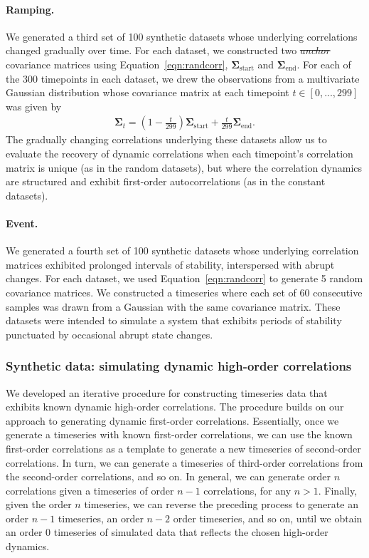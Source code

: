 \documentclass[english]{article}
\providecommand{\DIFaddtex}[1]{{\protect\color{blue}\uwave{#1}}} %
\providecommand{\DIFdeltex}[1]{{\protect\color{red}\sout{#1}}}                      %
\providecommand{\DIFaddbegin}{} %
\providecommand{\DIFaddend}{} %
\providecommand{\DIFdelbegin}{} %
\providecommand{\DIFdelend}{} %
\providecommand{\DIFadd}[1]{\texorpdfstring{\DIFaddtex{#1}}{#1}} %
\providecommand{\DIFdel}[1]{\texorpdfstring{\DIFdeltex{#1}}{}} %
\newcommand{\DIFscaledelfig}{0.5}
\newlength{\DIFdelgraphicswidth} %
\newlength{\DIFdelgraphicsheight} %
\newcommand{\DIFaddincludegraphics}[2][]{{\color{blue}\fbox{\DIFOincludegraphics[#1]{#2}}}} %
\newcommand{\DIFdelincludegraphics}[2][]{%
\sbox{\DIFdelgraphicsbox}{\DIFOincludegraphics[#1]{#2}}%
\settoboxwidth{\DIFdelgraphicswidth}{\DIFdelgraphicsbox} %
\settoboxtotalheight{\DIFdelgraphicsheight}{\DIFdelgraphicsbox} %
\scalebox{\DIFscaledelfig}{%
\parbox[b]{\DIFdelgraphicswidth}{\usebox{\DIFdelgraphicsbox}\\[-\baselineskip] \rule{\DIFdelgraphicswidth}{0em}}\llap{\resizebox{\DIFdelgraphicswidth}{\DIFdelgraphicsheight}{%
\setlength{\unitlength}{\DIFdelgraphicswidth}%
\begin{picture}(1,1)%
\thicklines\linethickness{2pt} %
{\color[rgb]{1,0,0}\put(0,0){\framebox(1,1){}}}%
{\color[rgb]{1,0,0}\put(0,0){\line( 1,1){1}}}%
{\color[rgb]{1,0,0}\put(0,1){\line(1,-1){1}}}%
\end{picture}%
}\hspace*{3pt}}} %
} %
\DeclareRobustCommand{\DIFaddbegin}{\DIFOaddbegin \let\includegraphics\DIFaddincludegraphics} %
\DeclareRobustCommand{\DIFaddend}{\DIFOaddend \let\includegraphics\DIFOincludegraphics} %
\DeclareRobustCommand{\DIFdelbegin}{\DIFOdelbegin \let\includegraphics\DIFdelincludegraphics} %
\DeclareRobustCommand{\DIFdelend}{\DIFOaddend \let\includegraphics\DIFOincludegraphics} %
\begin{document}
  \paragraph*{Ramping.}  We generated a third set of 100 synthetic
  datasets whose underlying correlations changed gradually over time.
  For each dataset, we constructed two \DIFdelbegin \textit{\DIFdel{anchor}} %
\DIFdelend \DIFaddbegin \DIFadd{``anchor'' }\DIFaddend covariance
  matrices using Equation~\ref{eqn:randcorr},
  $\mathbf{\Sigma}_{\mathrm{start}}$ and
  $\mathbf{\Sigma}_{\mathrm{end}}$.  For each of the 300 timepoints in
  each dataset, we drew the observations from a multivariate Gaussian
  distribution whose covariance matrix at each timepoint $t \in
  \left[0, ..., 299\right]$ was given by
  \begin{align}
    \mathbf{\Sigma}_t = \left( 1 - \frac{t}{299} \right)
    \mathbf{\Sigma}_{\mathrm{start}} + \frac{t}{299}\mathbf{\Sigma}_{\mathrm{end}}.
  \end{align}
The gradually changing correlations underlying these datasets allow us
to evaluate the recovery of dynamic correlations when each timepoint's
correlation matrix is unique (as in the random datasets), but where
the correlation dynamics are structured and exhibit first-order
autocorrelations (as in the constant datasets).

\paragraph*{Event.} We generated a fourth set of 100 synthetic datasets
whose underlying correlation matrices exhibited prolonged intervals of
stability, interspersed with abrupt changes.  For each dataset, we
used Equation~\ref{eqn:randcorr} to generate 5 random covariance
matrices.  We constructed a timeseries where each set of 60 consecutive samples
was drawn from a Gaussian with the same covariance matrix.  These
datasets were intended to simulate a system that exhibits periods of
stability punctuated by occasional abrupt state changes.

\subsubsection*{Synthetic data: simulating dynamic high-order
  correlations}

We developed an iterative procedure for constructing timeseries data
that exhibits known dynamic high-order correlations.  The procedure
builds on our approach to generating dynamic first-order correlations.
Essentially, once we generate a timeseries with known first-order
correlations, we can use the known first-order correlations as a
template to generate a new timeseries of second-order correlations.
In turn, we can generate a timeseries of third-order correlations from
the second-order correlations, and so on.  In general, we can generate
order $n$ correlations given a timeseries of order $n - 1$ correlations,
for any $n > 1$.  Finally, given the order $n$ timeseries, we can
reverse the preceding process to generate an order $n - 1$ timeseries, an
order $n - 2$ order timeseries, and so on, until we obtain an order 0
timeseries of simulated data that reflects the chosen high-order
dynamics.
\end{document}
